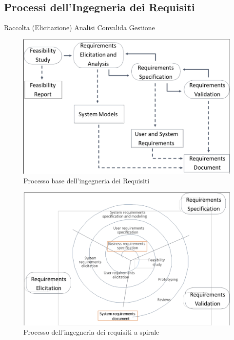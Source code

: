 \documentclass{article}
\begin{document}
	\subsection{Processi dell’Ingegneria dei Requisiti}
	Raccolta (Elicitazione)
	Analisi
	Convalida
	Gestione
	\begin{figure}[h]
		\centering
		\includegraphics[scale=0.3]{12.proc_ing_req.png}
		\caption{Processo base dell’ingegneria dei Requisiti}
		\label{fig:im-12}
	\end{figure}
	\begin{figure}[h]
		\centering
		\includegraphics[scale=0.3]{13.proc_ing_req_spir.png}
		\caption{Processo dell’ingegneria dei requisiti a spirale}
		\label{fig:im-13}
	\end{figure}
\end{document}
